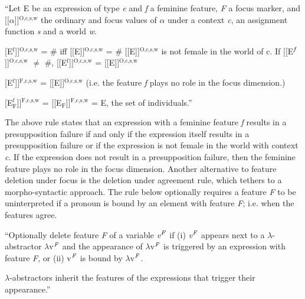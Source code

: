 \documentclass[output=paper,
modfonts
]{langscibook}
\begin{document}
\begin{exe}
	\ex \label{ex:irani:74}``Let E be an expression of type \textit{e} and \textit{f} a feminine feature, \textit{F} a focus marker, and {[}[\(\alpha\){]}]$^\text{{O,c,s,w}}$ the ordinary and focus values of \(\alpha\) under a context \textit{c}, an assignment function \textit{s} and a world \textit{w}.
	
	\begin{xlist}
		\ex {[}[E$^\text{{f}}${]}]$^\text{{O,c,s,w}}$ = \# iff {[}[E{]}]$^\text{{O,c,s,w}}$ = \# {[}[E{]}]$^\text{{O,c,s,w}}$ is not female in the world of c. If {[}[E$^\text{\textit{f}}${]}]$^\text{{O,c,s,w}}$ \(\neq\) \#, {[}[E$^\text{{f}}${]}]$^\text{{O,c,s,w}}$ = {[}[E{]}]$^\text{{O,c,s,w}}$
		
		\ex {[}[E$^\text{{f}}${]}]$^\text{{F,c,s,w}}$ = {[}[E{]}]$^\text{{O,c,s,w}}$ (i.e. the feature \textit{f} plays no role in the focus dimension.)
		
		\ex {[}[E$^\text{{f}}_\text{{F}}${]}]$^\text{{F,c,s,w}}$ = {[}[E$_\text{{F}}${]}]$^\text{{F,c,s,w}}$ = E, the set of individuals.'' \citep[1070]{Schlenker2014}
	\end{xlist}
	
\end{exe}

The above rule states that an expression with a feminine feature \textit{f} results in a presupposition failure if and only if the expression itself results in a presupposition failure or if the expression is not female in the world with context \textit{c}. If the expression does not result in a presupposition failure, then the feminine feature plays no role in the focus dimension. Another alternative to feature deletion under focus is the deletion under agreement rule, which tethers to a morpho-syntactic approach. The rule below optionally requires a feature \textit{F} to be uninterpreted if a pronoun is bound by an element with feature \textit{F}; i.e. when the features agree.

\begin{exe}
	\ex 
	\begin{xlist} 
		
		\ex \label{ex:irani:75a}``Optionally delete feature \textit{F} of a variable \textit{v$^\text{\textit{F}}$} if (i) \textit{v$^\text{\textit{F}}$} appears next to a \(\lambda\)-abstractor \(\lambda\)v$^\text{\textit{F}}$ and the appearance of \(\lambda\)v$^\text{\textit{F}}$ is triggered by an expression with feature \textit{F}, or (ii) v$^\text{\textit{F}}$ is bound by \(\lambda\)v$^\text{\textit{F}}$.
		
		\ex \(\lambda\)-abstractors inherit the features of the expressions that trigger their appearance.'' \citep[1071]{Schlenker2014}
	\end{xlist}
	
\end{exe} 
\end{document}
